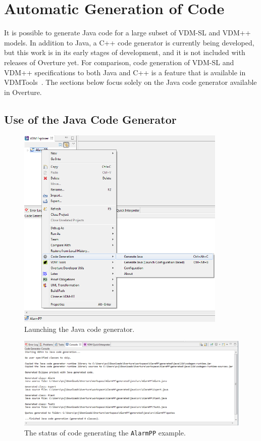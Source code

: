 
\chapter{Automatic Generation of Code}\label{sec:codegen}

It is possible to generate Java code for a
large subset of VDM-SL and VDM++ models. In addition to Java, a C++
code generator is currently being developed, but this work is in its
early stages of development, and it is not included with releases of
Overture yet. For comparison, code generation of VDM-SL and VDM++
specifications to both Java and C++ is a feature that is available in
VDMTools~\cite{Java2VDMMan,CGMan,CGManPP}. The sections below focus
solely on the Java code generator available in Overture.

\section{Use of the Java Code Generator}
\label{sec:javacg_use}

\begin{figure}[htbp]
\begin{center}
\includegraphics[width=10cm]{screenDumps/javacg_menu}
\caption{Launching the Java code generator.\label{fig:javacg_menu}}
\end{center}
\end{figure}

\begin{figure}[htbp]
\begin{center}
\includegraphics[width=\linewidth]{screenDumps/javacg_output}
\caption{The status of code generating the \texttt{AlarmPP} example.\label{fig:javacg_output}}
\end{center}
\end{figure}

